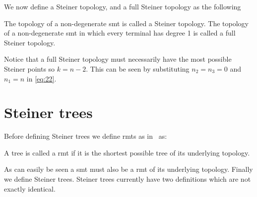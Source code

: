 We now define a Steiner topology, and a full Steiner topology as the following
%
\begin{definition}
The topology of a non-degenerate \ac{smt} is called a Steiner topology. The
topology of a non-degenerate \ac{smt} in which every terminal has degree 1 is
called a full Steiner topology.
\end{definition}
%
Notice that a full Steiner topology must necessarily have the most possible
Steiner points so $ k = n - 2$. This can be seen by substituting $n_2 = n_3 = 0$
and $n_1 = n$ in \cref{eq:22}.

\section{Steiner trees}
\label{sec:steiner-trees}

Before defining Steiner trees we define \acp{rmt} as in~\cite{gilbert1968}
as:
%
\begin{definition}
  A tree is called a \acl{rmt} if it is the shortest possible tree of its
  underlying topology.
\end{definition}
%
As can easily be seen a \ac{smt} must also be a \ac{rmt} of its underlying
topology. Finally we define Steiner trees. Steiner trees currently have two
definitions which are not exactly identical.

